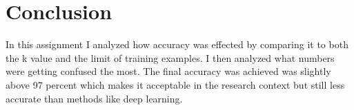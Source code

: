 \documentclass{article}
\begin{document}
\section{Conclusion}

In this assignment I analyzed how accuracy was effected by comparing it to both the k value and the limit of training examples. I then analyzed what numbers were getting confused the most. The final accuracy was achieved was slightly above 97 percent which makes it acceptable in the research context but still less accurate than methods like deep learning. 
\end{document}
